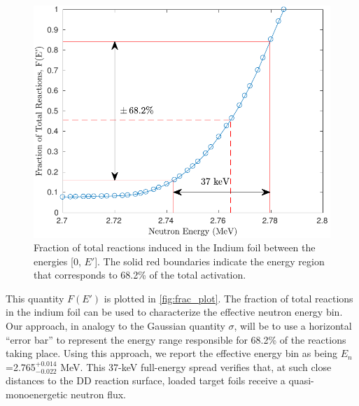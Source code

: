 \documentclass[5p]{elsarticle}
\newcommand{\pp}[1]{\left( #1\right)}
\newcommand{\comment}[1]{\todo[color=blue!20!white,inline]{ASV: #1}}
\begin{document}
\begin{figure}
 \centering
 \includegraphics[scale=0.6]{./figures/fracplot_new.pdf}
 \caption{Fraction of total reactions induced in the Indium foil between the energies [0, $E'$]. The solid red boundaries indicate the energy region that corresponds to 68.2\% of the total activation.}
 \label{fig:frac_plot}
\end{figure}



This quantity $F\pp{E'}$ is plotted in \autoref{fig:frac_plot}.
The fraction of total reactions in the indium foil can be used to characterize the effective neutron energy bin.
 Our approach, in analogy to the Gaussian quantity $\sigma$, will be to use a horizontal \enquote{error bar}  to represent the energy range responsible for 68.2\% of the reactions taking place.
 Using this approach, we report the effective energy bin as being $E_n$=2.765$^{+0.014}_{-0.022}$ MeV.
This 37-keV full-energy spread verifies that, at such close distances to the DD reaction surface, loaded target foils receive a quasi-monoenergetic neutron flux.
 

 
\end{document}
